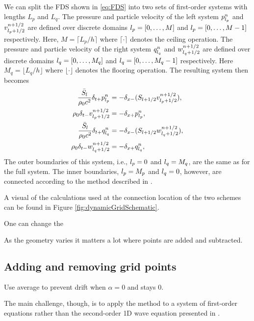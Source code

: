 We can split the FDS shown in \eqref{eq:FDS} into two sets of first-order systems with lengths $L_p$ and $L_q$. The pressure and particle velocity of the left system $p_{l_p}^n$ and $v_{{l_p}+1/2}^{n+1/2}$ are defined over discrete domains ${l_p} = [0, \hdots, M]$ and ${l_p} = [0, \hdots, M-1]$ respectively. Here, $M = \lceil L_p/h\rceil$ where $\lceil \cdot \rceil$ denotes the ceiling operation. The pressure and particle velocity of the right system $q_{l_q}^n$ and $w_{{l_q}+1/2}^{n+1/2}$ are defined over discrete domains ${l_q} = [0, \hdots, M_q]$ and ${l_q} = [0, \hdots, M_q-1]$ respectively. Here $M_q = \lfloor L_q/h\rfloor$ where $\lfloor \cdot \rfloor$ denotes the flooring operation. The resulting system then becomes
\begin{subequations}
    \begin{align}
        \frac{\bar S_{l}}{\rho_0 c^2}\delta_{t+}p_{l_p}^n &= -\delta_{x-}(S_{{l}+1/2}v_{{l_p}+1/2}^{n+1/2}),\label{eq:discPressureP}\\
        \rho_0 \delta_{t-}v_{{l_p}+1/2}^{n+1/2}&=-\delta_{x+}p_{l_p}^n,\label{eq:discVelocityV}\\
        \frac{\bar S_{l}}{\rho_0 c^2}\delta_{t+}q_{l_q}^n &= -\delta_{x-}(S_{{l}+1/2}w_{{l_q}+1/2}^{n+1/2}),\label{eq:discPressureP}\\
        \rho_0 \delta_{t-}w_{{l_q}+1/2}^{n+1/2}&=-\delta_{x+}q_{l_q}^n,\label{eq:discVelocityV}
    \end{align}
\end{subequations}
The outer boundaries of this system, i.e., ${l_p} = 0$ and ${l_q} = M_q$, are the same as for the full system. The inner boundaries, ${l_p} = M_p$ and ${l_q} = 0$, however, are connected according to the method described in \cite{Willemsen2021}.

A visual of the calculations used at the connection location of the two schemes can be found in Figure \ref{fig:dynamicGridSchematic}.




One can change the 


As the geometry varies it matters a lot where points are added and subtracted. 


\subsection{Adding and removing grid points}
Use average to prevent drift when $\alpha = 0$ and stays 0.

The main challenge, though, is to apply the method to a system of first-order equations rather than the second-order 1D wave equation presented in \cite{Willemsen2021}. 